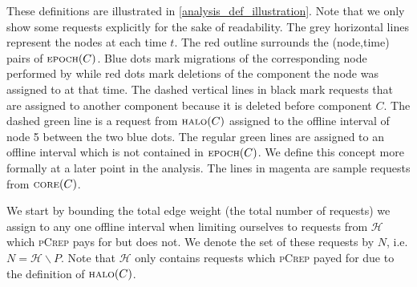 \documentclass[a4paper,UKenglish,cleveref, autoref, thm-restate,authorcolumns]{../lipics/lipics-v2019}
\newcommand{\adjDel}{\textsc{pCrep}}
\newcommand{\opt}{\text{O{\scriptsize PT}}}
\newcommand{\core}{\text{\scriptsize CORE}}
\newcommand{\halo}{\text{\scriptsize HALO}}
\newcommand{\epoch}{\text{\scriptsize EPOCH}}
\begin{document}
These definitions are illustrated in \cref{analysis_def_illustration}. Note that we only show some requests explicitly for the sake of readability. 
The grey horizontal lines represent the nodes at each time $t$. The red outline surrounds the (node,time) pairs of $\epoch(C)$. 
Blue dots mark migrations of the corresponding node performed by \opt{} while red dots mark deletions of the component the node was assigned to at that time. 
The dashed vertical lines in black mark requests that are assigned to another component because it is deleted before component $C$. 
The dashed green line is a request from $\halo(C)$ assigned to the offline interval of node 5 between the two blue dots. The regular green lines are assigned to 
an offline interval which is not contained in $\epoch(C)$. We define this concept more formally at a later point in the analysis. 
The lines in magenta are sample requests from $\core(C)$.

We start by bounding the total edge weight (the total number of requests) we assign to any one offline interval when limiting ourselves to requests from $\mathcal{H}$ which \adjDel{} pays for but \opt{} does not. We denote the set of these requests by $N$, i.e. $N=\mathcal{H}\backslash P$. Note that $\mathcal{H}$ only contains requests which \adjDel{} payed for due to the definition of $\halo(C)$.
\end{document}
